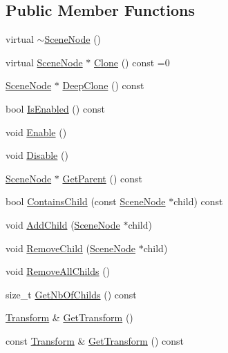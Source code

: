 \subsection*{Public Member Functions}
\begin{DoxyCompactItemize}
\item 
virtual \hyperlink{classmage_1_1_scene_node_a6705beea9c535de3d495762ed06e74dd}{$\sim$\+Scene\+Node} ()
\item 
virtual \hyperlink{classmage_1_1_scene_node}{Scene\+Node} $\ast$ \hyperlink{classmage_1_1_scene_node_a85d62213a900cd8e45864b8cde5929e9}{Clone} () const =0
\item 
\hyperlink{classmage_1_1_scene_node}{Scene\+Node} $\ast$ \hyperlink{classmage_1_1_scene_node_a5dcfacd607e3f8554f7eac73a51be334}{Deep\+Clone} () const
\item 
bool \hyperlink{classmage_1_1_scene_node_a5e3b2a5d21cb2e17df4ae50344bd6bbc}{Is\+Enabled} () const
\item 
void \hyperlink{classmage_1_1_scene_node_a7fb08a122d822394a96a9c2bcf6aab7f}{Enable} ()
\item 
void \hyperlink{classmage_1_1_scene_node_ab2113dd62439d81a31bdfdf44d02061e}{Disable} ()
\item 
\hyperlink{classmage_1_1_scene_node}{Scene\+Node} $\ast$ \hyperlink{classmage_1_1_scene_node_a512a9d0f935abf304980312680be3f30}{Get\+Parent} () const
\item 
bool \hyperlink{classmage_1_1_scene_node_a99c86a1d18b41d4c5ce0384ba53a0952}{Contains\+Child} (const \hyperlink{classmage_1_1_scene_node}{Scene\+Node} $\ast$child) const
\item 
void \hyperlink{classmage_1_1_scene_node_ac07f89af783b1658a1f74205914f6fa3}{Add\+Child} (\hyperlink{classmage_1_1_scene_node}{Scene\+Node} $\ast$child)
\item 
void \hyperlink{classmage_1_1_scene_node_a42aa6487f21c948ab7ce6f64a57e5f11}{Remove\+Child} (\hyperlink{classmage_1_1_scene_node}{Scene\+Node} $\ast$child)
\item 
void \hyperlink{classmage_1_1_scene_node_aabce9f839d51966c9dcdcde46ba9fc0f}{Remove\+All\+Childs} ()
\item 
size\+\_\+t \hyperlink{classmage_1_1_scene_node_a99c5eb3c253a2e620bd85ac845d3bb77}{Get\+Nb\+Of\+Childs} () const
\item 
\hyperlink{structmage_1_1_transform}{Transform} \& \hyperlink{classmage_1_1_scene_node_a72bfe51e9f233dd35fd8affd24b0a67a}{Get\+Transform} ()
\item 
const \hyperlink{structmage_1_1_transform}{Transform} \& \hyperlink{classmage_1_1_scene_node_ab68ffa4886e8e5ff9757362823a1aa74}{Get\+Transform} () const

\end{DoxyCompactItemize}
